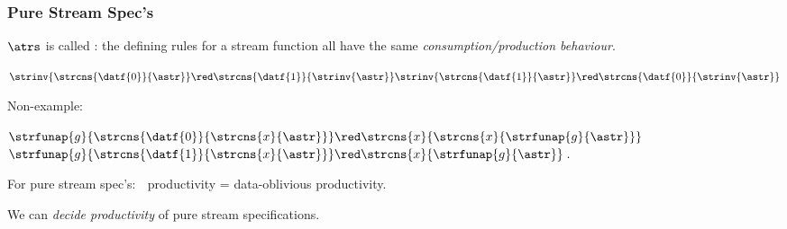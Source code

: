 \documentclass[10pt]{beamer}
\begin{document}
\begin{frame}%
  \frametitle{Pure Stream Spec's}


\vspace*{\fill}

$\atrs$ is called :
  the defining rules for a stream function %
  all have the same \emph{consumption/production behaviour}. 

\vspace*{\fill}

\begin{example}
  \hspace*{1ex}
\parbox[t]{90pt}{
 $\strinv{\strcns{\datf{0}}{\astr}} \red \strcns{\datf{1}}{\strinv{\astr}} \\
  \strinv{\strcns{\datf{1}}{\astr}} \red \strcns{\datf{0}}{\strinv{\astr}}$}
%
\hspace*{15pt}
%
Non-example:
% 
\parbox[t]{110pt}{
$\strfunap{g}{ \strcns{\datf{0}}{\strcns{x}{\astr}} } 
 \red \strcns{x}{\strcns{x}{\strfunap{g}{{\astr}}}}$\\
$\strfunap{g}{\strcns{\datf{1}}{\strcns{x}{\astr}}}
 \red \strcns{x}{\strfunap{g}{{\astr}}} \; . $
}
\end{example}

\vspace*{\fill}

\begin{proposition}%
  For pure stream spec's: $\;$ productivity = data-oblivious productivity.
\end{proposition}

\vspace*{\fill}

\begin{theorem}
  We can \emph{decide productivity} of pure stream specifications.
\end{theorem}

\vspace*{\fill}

\end{frame}%
\end{document}

